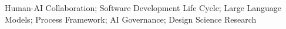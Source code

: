 \acresetall
\noindent Human-AI Collaboration; Software Development Life Cycle; Large Language Models; Process Framework; AI Governance; Design Science Research
